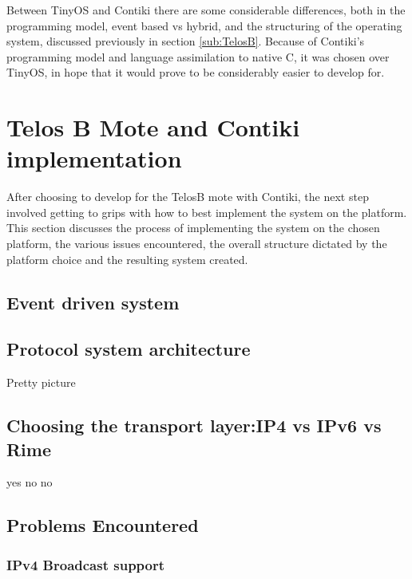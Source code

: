 Between TinyOS and Contiki there are some considerable differences, both in the programming model, event based vs hybrid, and the structuring of the operating system, discussed previously in section \ref{sub:TelosB}. Because of Contiki's programming model and language assimilation to native C, it was chosen over TinyOS, in hope that it would prove to be considerably easier to develop for.


\section{Telos B Mote and Contiki implementation} %
\label{sec:contiki}
After choosing to develop for the TelosB mote with Contiki, the next step involved getting to grips with how to best implement the system on the platform. This section discusses the process of implementing the system on the chosen platform, the various issues encountered, the overall structure dictated by the platform choice and the resulting system created. 

\subsection{Event driven system} %
\label{sub:event_driven_system}


\subsection{Protocol system architecture} %
\label{sub:protocol_system_architecture}
Pretty picture

\subsection{Choosing the transport layer:IP4 vs IPv6 vs Rime} %
\label{sub:ip4_vs_ipv6_vs_rime}
yes no no

\subsection{Problems Encountered} %
\label{sub:problems_encountered}

\subsubsection{IPv4 Broadcast support} %
\label{sub:ipv4_broadcast_support}


